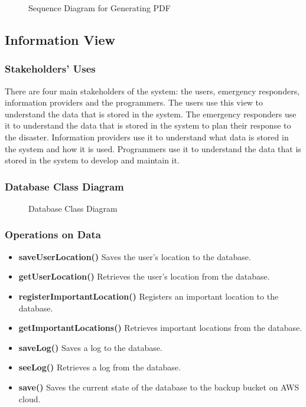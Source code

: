 \documentclass[a4paper]{article}
\begin{document}
    \begin{figure}
        
        \caption{Sequence Diagram for Generating PDF}
    \end{figure}

    \subsection{Information View}
    \subsubsection{Stakeholders' Uses}
    There are four main stakeholders of the system: the users, emergency responders, information providers and the programmers.
    The users use this view to understand the data that is stored in the system. The emergency responders use it to understand
    the data that is stored in the system to plan their response to the disaster. Information providers use it to understand
    what data is stored in the system and how it is used. Programmers use it to understand the data that is stored in the system
    to develop and maintain it.
    \subsubsection{Database Class Diagram}

    \begin{figure}
        
        \caption{Database Class Diagram}
    \end{figure}

    \subsubsection{Operations on Data}
    
    \begin{itemize}
        \item \textbf{saveUserLocation()} Saves the user's location to the database.
        \item \textbf{getUserLocation()} Retrieves the user's location from the database.
        \item \textbf{registerImportantLocation()} Registers an important location to the database.
        \item \textbf{getImportantLocations()} Retrieves important locations from the database.
        \item \textbf{saveLog()} Saves a log to the database.
        \item \textbf{seeLog()} Retrieves a log from the database.
        \item \textbf{save()} Saves the current state of the database to the backup bucket on AWS cloud.
    \end{itemize}
\end{document}
